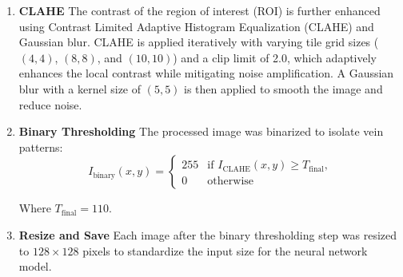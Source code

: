 \begin{enumerate}
    \item \textbf{CLAHE}
    The contrast of the region of interest (ROI) is further enhanced using Contrast Limited Adaptive Histogram Equalization (CLAHE) and Gaussian blur. CLAHE is applied iteratively with varying tile grid sizes (\((4, 4)\), \((8, 8)\), and \((10, 10)\)) and a clip limit of 2.0, which adaptively enhances the local contrast while mitigating noise amplification. A Gaussian blur with a kernel size of \((5, 5)\) is then applied to smooth the image and reduce noise.

    \item \textbf{Binary Thresholding}
    The processed image was binarized to isolate vein patterns:
    \[
    I_{\text{binary}}(x, y) =
    \begin{cases}
    255 & \text{if } I_{\text{CLAHE}}(x, y) \geq T_{\text{final}}, \\
    0 & \text{otherwise}
    \end{cases}
    \]

    Where \( T_{\text{final}} = 110 \).

    \item \textbf{Resize and Save} 
    Each image after the binary thresholding step was resized to \( 128 \times 128 \) pixels to standardize the input size for the neural network model.


\end{enumerate}
